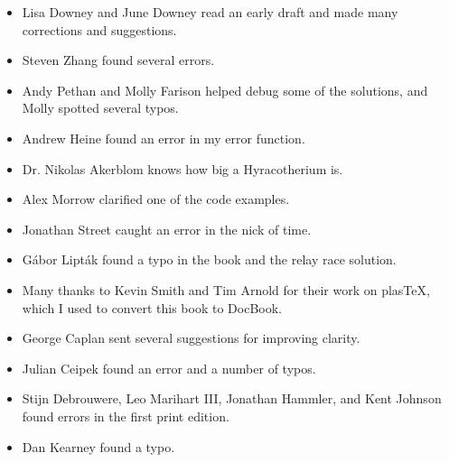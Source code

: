 \documentclass[12pt]{book}
\begin{document}
\begin{itemize}

\item Lisa Downey and June Downey read an early draft and made many
corrections and suggestions.

\item Steven Zhang found several errors.

\item Andy Pethan and Molly Farison helped debug some of the solutions,
and Molly spotted several typos.

\item Andrew Heine found an error in my error function.

\item Dr. Nikolas Akerblom knows how big a Hyracotherium is.

\item Alex Morrow clarified one of the code examples.

\item Jonathan Street caught an error in the nick of time.

\item G\'{a}bor Lipt\'{a}k found a typo in the book and the relay race solution.

\item Many thanks to Kevin Smith and Tim Arnold for their work on
plasTeX, which I used to convert this book to DocBook.

\item George Caplan sent several suggestions for improving clarity.

\item Julian Ceipek found an error and a number of typos.

\item Stijn Debrouwere, Leo Marihart III, Jonathan Hammler, and Kent Johnson
found errors in the first print edition.

\item Dan Kearney found a typo.


\end{itemize}

\normalsize

\clearemptydoublepage

\begin{latexonly}

\tableofcontents

\clearemptydoublepage

\end{latexonly}
\end{document}
